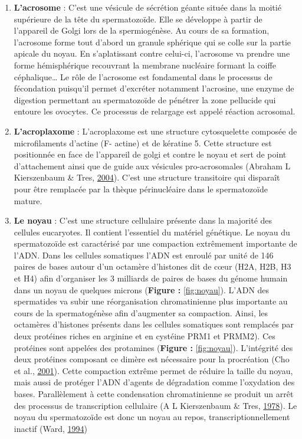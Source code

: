 \documentclass[12pt,twoside]{reedthesis}
\providecommand{\tightlist}{%
  \setlength{\itemsep}{0pt}\setlength{\parskip}{0pt}}
\theoremstyle{definition}
\theoremstyle{definition}
\theoremstyle{remark}
\begin{document}
  \begin{enumerate}
  \def\labelenumi{\arabic{enumi}.}
  \tightlist
  \item
    \textbf{L'acrosome} : C'est une vésicule de sécrétion géante située
    dans la moitié supérieure de la tête du spermatozoïde. Elle se
    développe à partir de l'appareil de Golgi lors de la spermiogénèse. Au
    cours de sa formation, l'acrosome forme tout d'abord un granule
    sphérique qui se colle sur la partie apicale du noyau. En
    s'aplatissant contre celui-ci, l'acrosome va prendre une forme
    hémisphérique recouvrant la membrane nucléaire formant la coiffe
    céphalique\ldots{} Le rôle de l'acrosome est fondamental dans le
    processus de fécondation puisqu'il permet d'excréter notamment
    l'acrosine, une enzyme de digestion permettant au spermatozoïde de
    pénétrer la zone pellucide qui entoure les ovocytes. Ce processus de
    relargage est appelé réaction acrosomal.\\
  \item
    \textbf{L'acroplaxome} : L'acroplaxome est une structure cytosquelette
    composée de microfilaments d'actine (F- actine) et de kératine 5.
    Cette structure est positionnée en face de l'appareil de golgi et
    contre le noyau et sert de point d'attachement ainsi que de guide aux
    vésicules pro-acrosomales (Abraham L Kierszenbaum \& Tres,
    \protect\hyperlink{ref-Kierszenbaum2004}{2004}). C'est une structure
    transitoire qui disparaît pour être remplacée par la thèque
    périnucléaire dans le spermatozoïde mature.\\
  \item
    \textbf{Le noyau} : C'est une structure cellulaire présente dans la
    majorité des cellules eucaryotes. Il contient l'essentiel du matériel
    génétique. Le noyau du spermatozoïde est caractérisé par une
    compaction extrêmement importante de l'ADN. Dans les cellules
    somatiques l'ADN est enroulé par unité de 146 paires de bases autour
    d'un octamère d'histones dit de cœur (H2A, H2B, H3 et H4) afin
    d'organiser les 3 milliards de paires de bases du génome humain dans
    un noyau de quelques microns (\textbf{Figure : }\ref{fig:noyau}).
    L'ADN des spermatides va subir une réorganisation chromatinienne plus
    importante au cours de la spermatogénèse afin d'augmenter sa
    compaction. Ainsi, les octamères d'histones présents dans les cellules
    somatiques sont remplacés par deux protéines riches en arginine et en
    cystéine PRM1 et PRMM2). Ces protéines sont appelées des protamines
    (\textbf{Figure : }\ref{fig:noyau}). L'intégrité des deux protéines
    composant ce dimère est nécessaire pour la procréation (Cho et al.,
    \protect\hyperlink{ref-Cho2001}{2001}). Cette compaction extrême
    permet de réduire la taille du noyau, mais aussi de protéger l'ADN
    d'agents de dégradation comme l'oxydation des bases. Parallèlement à
    cette condensation chromatinienne se produit un arrêt des processus de
    transcription cellulaire (A L Kierszenbaum \& Tres,
    \protect\hyperlink{ref-Kierszenbaum1978}{1978}). Le noyau du
    spermatozoïde est donc un noyau au repos, transcriptionnellement
    inactif (Ward, \protect\hyperlink{ref-Ward1994}{1994})
  \end{enumerate}
  
\end{document}
